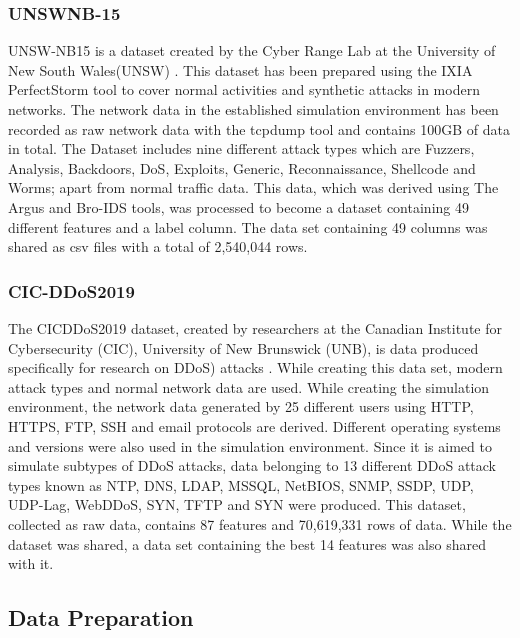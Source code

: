 \documentclass{article}
\begin{document}
\subsubsection{UNSWNB-15}

UNSW-NB15 is a dataset created by the Cyber Range Lab at the University of New South Wales(UNSW) \cite{Unswnb15}. This dataset has been prepared using the IXIA PerfectStorm tool to cover normal activities and synthetic attacks in modern networks. The network data in the established simulation environment has been recorded as raw network data with the tcpdump tool and contains 100GB of data in total. The Dataset includes nine different attack types which are Fuzzers, Analysis, Backdoors, DoS, Exploits, Generic, Reconnaissance, Shellcode and Worms; apart from normal traffic data. This data, which was derived using The Argus and Bro-IDS tools, was processed to become a dataset containing 49 different features and a label column. The data set containing 49 columns was shared as csv files with a total of 2,540,044 rows.

\subsubsection{CIC-DDoS2019}

The CICDDoS2019 dataset, created by researchers at the Canadian Institute for Cybersecurity (CIC), University of New Brunswick (UNB), is data produced specifically for research on DDoS) attacks \cite{CICDDoS2019}. While creating this data set, modern attack types and normal network data are used. While creating the simulation environment, the network data generated by 25 different users using HTTP, HTTPS, FTP, SSH and email protocols are derived. Different operating systems and versions were also used in the simulation environment. Since it is aimed to simulate subtypes of DDoS attacks, data belonging to 13 different DDoS attack types known as NTP, DNS, LDAP, MSSQL, NetBIOS, SNMP, SSDP, UDP, UDP-Lag, WebDDoS, SYN, TFTP and SYN were produced. This dataset, collected as raw data, contains 87 features and 70,619,331 rows of data. While the dataset was shared, a data set containing the best 14 features was also shared with it.

\subsection{Data Preparation}
\end{document}
